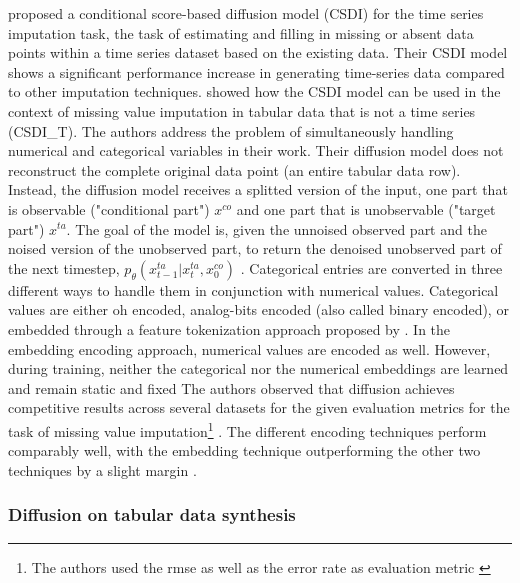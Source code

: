 \textcite{tashiro2021CSDIConditionalScorebased} proposed a conditional score-based diffusion model (CSDI) for the time series imputation task, \ie the task of estimating and filling in missing or absent data points within a time series dataset based on the existing data.
Their CSDI model shows a significant performance increase in generating time-series data compared to other imputation techniques.
\cite{zheng2022DiffusionModelsMissing} showed how the CSDI model can be used in the context of missing value imputation in tabular data that is not a time series (CSDI\_T).
The authors address the problem of simultaneously handling numerical and categorical variables in their work.
Their diffusion model does not reconstruct the complete original data point (\eg an entire tabular data row). 
Instead, the diffusion model receives a splitted version of the input, one part that is observable ("conditional part") $x^{co}$ and one part that is unobservable ("target part") $x^{ta}$.
The goal of the model is, given the unnoised observed part and the noised version of the unobserved part, to return the denoised unobserved part of the next timestep, 
\ie $p_\theta(x^{ta}_{t-1}|x^{ta}_{t},x^{co}_{0})$ \cite{zheng2022DiffusionModelsMissing}.
Categorical entries are converted in three different ways to handle them in conjunction with numerical values.
Categorical values are either \gls{oh} encoded, analog-bits encoded (also called binary encoded), or embedded through a feature tokenization approach proposed by \cite{gorishniy2021RevisitingDeepLearning}.
In the embedding encoding approach, numerical values are encoded as well. 
However, during training, neither the categorical nor the numerical embeddings are learned and remain static and fixed \cite{zheng2023DiffusionModelsMissing}
The authors observed that diffusion achieves competitive results across several datasets for the given evaluation metrics for the task of missing value imputation\footnote{The authors used the \gls{rmse} as well as the error rate as evaluation metric \cite[p. 2]{zheng2023DiffusionModelsMissing}} \cite{zheng2022DiffusionModelsMissing}.
The different encoding techniques perform comparably well, with the embedding technique outperforming the other two techniques by a slight margin \cite{zheng2022DiffusionModelsMissing}.


\subsubsection{Diffusion on tabular data synthesis}
\label{ch:relatedWork-diffusionModels-tabDDPM}

